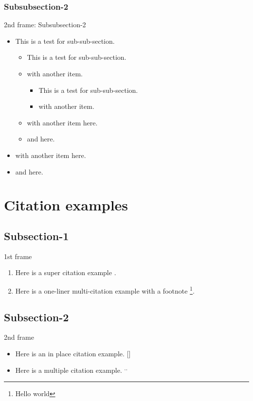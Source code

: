 \subsubsection{Subsubsection-2}
\begin{frame}{2nd frame: Subsubsection-2}
\begin{itemize}
    \item This is a test for sub-sub-section.
    \begin{itemize}
        \item This is a test for sub-sub-section.
        \item with another item.
        \begin{itemize}
            \item This is a test for sub-sub-section.
            \item with another item.
        \end{itemize}
        \item with another item here.
        \item and here.
    \end{itemize}
    \item with another item here.
    \item and here.
\end{itemize}
\end{frame}

\section{Citation examples}
\subsection{Subsection-1}
\begin{frame}{1st frame}
\begin{enumerate}

    \item Here is a super citation example \cite{Rubel2014, Nicklas2010}.
    \item Here is a one-liner multi-citation example  with a footnote \renewcommand{\thefootnote}{\roman{footnote}}\footnote{Hello world}.
\end{enumerate}
\end{frame}

\subsection{Subsection-2}
\begin{frame}{2nd frame}
    \begin{itemize}
        \item Here is an in place citation example. [{\scriptsize {}}]
        \item Here is a multiple citation example. $^,$$^,$
    \end{itemize}
\end{frame}

